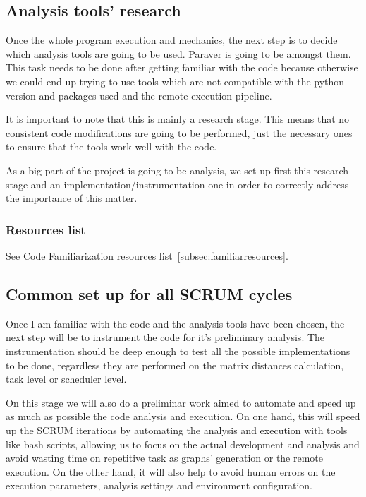 \subsection{Analysis tools' research}

Once the whole program execution and mechanics, the next step is to decide which analysis tools are going to be used. Paraver is going to be amongst them. This task needs to be done after getting familiar with the code because otherwise we could end up trying to use tools which are not compatible with the python version and packages used and the remote execution pipeline. 

It is important to note that this is mainly a research stage. This means that no consistent code modifications are going to be performed, just the necessary ones to ensure that the tools work well with the code.

As a big part of the project is going to be analysis, we set up first this research stage and an implementation/instrumentation one in order to correctly address the importance of this matter.

\subsubsection{Resources list}
See \hypertarget{subsec:familiarresources}{Code Familiarization resources list~\ref{subsec:familiarresources}}.

\subsection{Common set up for all SCRUM cycles}
\label{subsec:setup}

Once I am familiar with the code and the analysis tools have been chosen, the next step will be to instrument the code for it's preliminary analysis. The instrumentation should be deep enough to test all the possible implementations to be done, regardless they are performed on the matrix distances calculation, task level or scheduler level. 

On this stage we will also do a preliminar work aimed to automate and speed up as much as possible the code analysis and execution. On one hand, this will speed up the SCRUM iterations by automating the analysis and execution with tools like bash scripts, allowing us to focus on the actual development and analysis and avoid wasting time on repetitive task as graphs' generation or the remote execution. On the other hand, it will also help to avoid human errors on the execution parameters, analysis settings and environment configuration.

